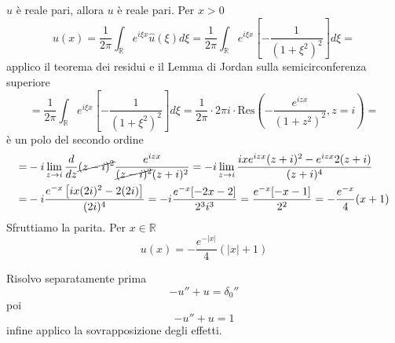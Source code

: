 $\hat{u}$ è reale pari, allora $u$ è reale pari. Per $x >0$
\begin{equation*}
u( x) =\frac{1}{2\pi }\int _{\mathbb{R}} e^{i\xi x}\hat{u}( \xi ) d\xi =\frac{1}{2\pi }\int _{\mathbb{R}} e^{i\xi x}\left[ -\frac{1}{\left( 1+\xi ^{2}\right)^{2}}\right] d\xi =
\end{equation*}
applico il teorema dei residui e il Lemma di Jordan sulla semicirconferenza superiore
\begin{equation*}
=\frac{1}{2\pi }\int _{\mathbb{R}} e^{i\xi x}\left[ -\frac{1}{\left( 1+\xi ^{2}\right)^{2}}\right] d\xi =\frac{1}{2\pi } \cdotp 2\pi i\cdotp \mathrm{Res}\left( -\frac{e^{izx}}{\left( 1+z^{2}\right)^{2}} ,z=i\right) =
\end{equation*}
è un polo del secondo ordine
\begin{equation*}
\begin{aligned}
= & -i\lim\limits _{z\rightarrow i}\frac{d}{dz}\cancel{( z-i)^{2}}\frac{e^{izx}}{\cancel{( z-i)^{2}}( z+i)^{2}} =-i\lim\limits _{z\rightarrow i}\frac{ixe^{izx}( z+i)^{2} -e^{izx} 2( z+i)}{( z+i)^{4}}\\
= & -i\frac{e^{-x}\left[ ix( 2i)^{2} -2( 2i)\right]}{( 2i)^{4}} =-i\frac{e^{-x}[ -2x-2]}{2^{3} i^{3}} =\frac{e^{-x}[ -x-1]}{2^{2}} =-\frac{e^{-x}}{4}( x+1)
\end{aligned}
\end{equation*}
Sfruttiamo la parita. Per $x\in \mathbb{R}$
\begin{equation*}
u( x) =-\frac{e^{-| x| }}{4}(| x| +1)
\end{equation*}
\Soluzione

Risolvo separatamente prima
\begin{equation*}
-u''+u=\delta _{0} ''
\end{equation*}
poi
\begin{equation*}
-u''+u=1
\end{equation*}
infine applico la sovrapposizione degli effetti.

